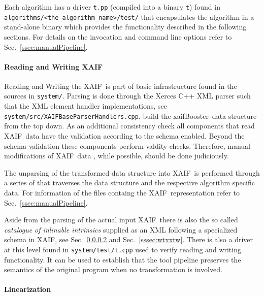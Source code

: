 \documentclass[11pt]{article}
\newcommand{\xaif}{XAIF}
\newcommand{\xaifBooster}{xaifBooster}
\newcommand{\code}[1]{{\small\tt{#1}}}
\newcommand{\refsec}[1]{{Sec.~\ref{#1}}}
\begin{document}
Each algorithm has a driver \code{t.pp} (compiled into a binary \code{t}) 
found in \code{algorithms/<the\_algorithm\_name>/test/} 
that encapsulates the algorithm 
in a stand-alone binary which provides the functionality described 
in the following 
sections. For details on the invocation and command line options refer to 
\refsec{ssec:manualPipeline}.

\paragraph{Reading and Writing \xaif}\label{ssssec:readWriteXaif}
Reading and Writing the \xaif\ is part of basic infrastructure
found in the sources in \code{system/}.
Parsing is done through the Xerces C++ XML parser \cite{xercesWeb}
such that the XML element handler implementations, see \code{system/src/XAIFBaseParserHandlers.cpp},
build the \xaifBooster\ data 
structure from the top down. 
As an additional consistency check all components that read \xaif\ data 
have the validation according to the schema enabled. Beyond the schema 
validation these components perform valdity checks. Therefore, 
manual modifications of \xaif\ data , while possible, should 
be done judiciously. 

The unparsing of the transformed data structure into \xaif\ is performed 
through a series of that traverses the data structure and the 
respective algorithm specific data. 
For information of the files containg the \xaif\ representation refer to 
\refsec{ssec:manualPipeline}.

Aside from the parsing of the actual input \xaif\ there is also the so called 
{\em 
  catalogue of inlinable intrinsics
} 
supplied as an XML following a specialized schema in \xaif, see  
\refsec{sssec:linearization} and \refsec{sssec:wtxxtw}.
There is also a driver at this level found in \code{system/test/t.cpp} used 
to verify reading and writing functionality. It can be used to establish 
that the tool pipeline preserves the semantics of the original program when 
no transformation is involved. 

\paragraph{Linearization}\label{sssec:linearization}
\end{document}
